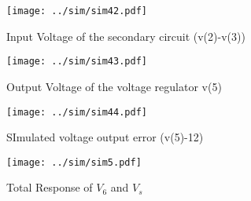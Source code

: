 \begin{figure}[ht!] \centering
\texttt{[image: ../sim/sim42.pdf]}
\caption{Input Voltage of the secondary circuit (v(2)-v(3))} 
\label{fig:sim42}
\end{figure}

\begin{figure}[ht!] \centering
\texttt{[image: ../sim/sim43.pdf]}
\caption{Output Voltage of the voltage regulator v(5)} 
\label{fig:sim43}
\end{figure}

\begin{figure}[ht!] \centering
\texttt{[image: ../sim/sim44.pdf]}
\caption{SImulated voltage output error (v(5)-12)} 
\label{fig:sim44}
\end{figure}


\begin{figure}[ht!] \centering
\texttt{[image: ../sim/sim5.pdf]}
\caption{Total Response of $V_{6}$ and $V_{s}$}
\label{fig:sim5}
\end{figure}





